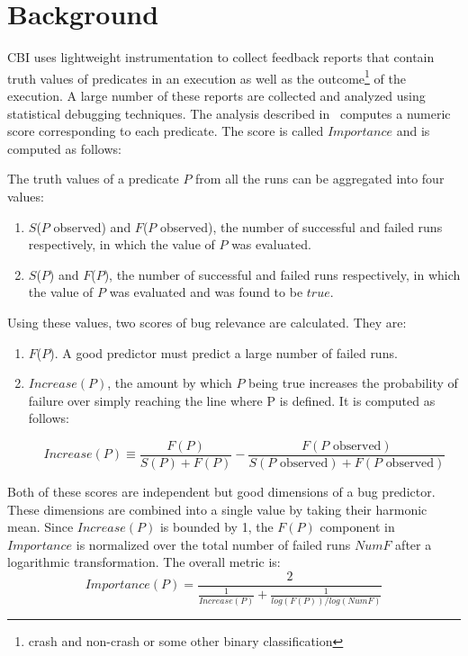 
\section{Background}
\label{sec-bground}
CBI uses lightweight instrumentation to collect feedback reports that contain truth values of predicates in an execution as well as the outcome{\footnote{crash and non-crash or some other binary classification}} of the execution.  A large number of these reports are collected and analyzed using statistical debugging techniques.  The analysis described in~\cite{Liblit:2005:SSBI} computes a numeric score corresponding to each predicate.  The score is called $Importance$ and is computed as follows:

The truth values of a predicate $P$ from all the runs can be aggregated into four values:

\begin{enumerate}
\item $S$($P$ observed) and $F$($P$ observed), the number of successful and failed runs respectively, in which the value of $P$ was evaluated.
\item $S$($P$) and $F$($P$), the number of successful and failed runs respectively, in which the value of $P$ was evaluated and was found to be $true$.
\end{enumerate}

Using these values, two scores of bug relevance are calculated.  They are:
\begin{enumerate}
\item $F$($P$).  A good predictor must predict a large number of failed runs.
\item $Increase(P)$, the amount by which $P$ being true increases the probability of failure over simply reaching the line where P is defined.  It is computed as follows:

\begin{equation}
\label{eqn1}
Increase(P) \equiv 
\frac{F(P)}{S(P) + F(P)}
-
\frac{F(\text{$P$ observed})}{S(\text{$P$ observed}) +
  F(\text{$P$ observed})}
\end{equation}
\end{enumerate}

Both of these scores are independent but good dimensions of a bug predictor.  These dimensions are combined into a single value by taking their harmonic mean.  Since $Increase(P)$ is bounded by 1, the $F(P)$ component in $Importance$ is normalized over the total number of failed runs $NumF$ after a logarithmic transformation.  The overall metric is:
\begin{equation}
\label{eqn2}
Importance(P) =
\frac{2}{
  \frac{1}{Increase(P)}
  +
  \frac{1}{log(F(P)) / log(NumF)}}
\end{equation}

